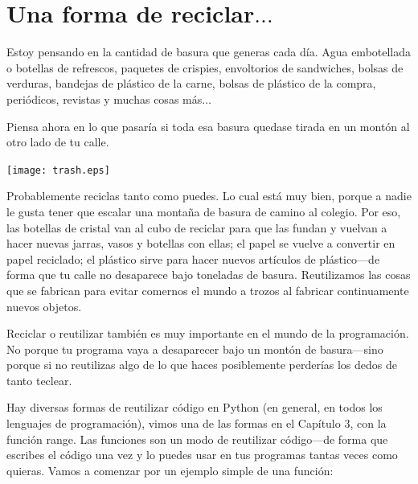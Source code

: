

\chapter{Una forma de reciclar$\ldots$}\label{ch:sortoflikerecycling}

Estoy pensando en la cantidad de basura que generas cada día. Agua embotellada o botellas de refrescos, paquetes de crispies, envoltorios de sandwiches, bolsas de verduras, bandejas de plástico de la carne, bolsas de plástico de la compra, periódicos, revistas y muchas cosas más$\ldots$
\par
Piensa ahora en lo que pasaría si toda esa basura quedase tirada en un montón al otro lado de tu calle.

\begin{center}
\texttt{[image: trash.eps]}
\end{center}

Probablemente reciclas tanto como puedes.  Lo cual está muy bien, porque a nadie le gusta tener  que escalar una montaña de basura de camino al colegio.  Por eso, las botellas de cristal van al cubo de reciclar para que las fundan y vuelvan a hacer nuevas jarras, vasos y botellas con ellas; el papel se vuelve a convertir en papel reciclado; el plástico sirve para hacer nuevos artículos de plástico---de forma que tu calle no desaparece bajo toneladas de basura. Reutilizamos las cosas que se fabrican para evitar comernos el mundo a trozos al fabricar continuamente nuevos objetos.

Reciclar o reutilizar también es muy importante en el mundo de la programación. No porque tu programa vaya a desaparecer bajo un montón de basura---sino porque si no reutilizas algo de lo que haces posiblemente perderías los dedos de tanto teclear.

Hay diversas formas de reutilizar código en Python (en general, en todos los lenguajes de programación), vimos una de las formas en el Capítulo 3, con la función range.  Las funciones son un modo de reutilizar código---de forma que escribes el código una vez y lo puedes usar en tus programas tantas veces como quieras.  Vamos a comenzar por un ejemplo simple de una función:

